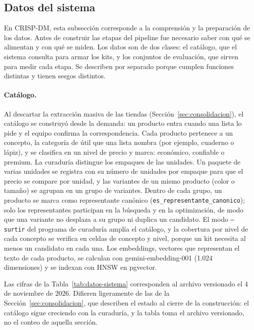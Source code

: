 \subsection{Datos del sistema}
\label{anx:datos-sistema}

En CRISP-DM, esta subsección corresponde a la comprensión y la preparación de los datos. Antes de
construir las etapas del pipeline fue necesario saber con qué se alimentan y con qué se miden. Los
datos son de dos clases: el catálogo, que el sistema consulta para armar los kits, y los conjuntos de
evaluación, que sirven para medir cada etapa. Se describen por separado porque cumplen funciones
distintas y tienen sesgos distintos.

\paragraph{Catálogo.} Al descartar la extracción masiva de las tiendas (Sección~\ref{sec:consolidacion}),
el catálogo se construyó desde la demanda: un producto entra cuando una lista lo pide y el equipo
confirma la correspondencia. Cada producto pertenece a un concepto, la categoría de útil que una lista
nombra (por ejemplo, cuaderno o lápiz), y se clasifica en un nivel de precio y marca: económico,
confiable o premium. La curaduría distingue los empaques de las unidades. Un paquete de varias unidades
se registra con su número de unidades por empaque para que el precio se compare por unidad, y las
variantes de un mismo producto (color o tamaño) se agrupan en un grupo de variantes. Dentro de cada
grupo, un producto se marca como representante canónico (\texttt{es\_representante\_canonico}); solo
los representantes participan en la búsqueda y en la optimización, de modo que una variante no
desplaza a su grupo ni duplica un candidato. El modo \texttt{--surtir} del programa de curaduría
amplía el catálogo, y la cobertura por nivel de cada concepto
se verifica en celdas de concepto y nivel, porque un kit necesita al menos un candidato en cada una.
Los embeddings, vectores que representan el texto de cada producto, se calculan con
gemini-embedding-001 (1.024 dimensiones) y se indexan con HNSW en pgvector.



Las cifras de la Tabla~\ref{tab:datos-sistema} corresponden al archivo versionado el 4 de noviembre de
2026. Difieren ligeramente de las de la Sección~\ref{sec:consolidacion}, que describen el estado al
cierre de la construcción: el catálogo sigue creciendo con la curaduría, y la tabla toma el archivo
versionado, no el conteo de aquella sección.

